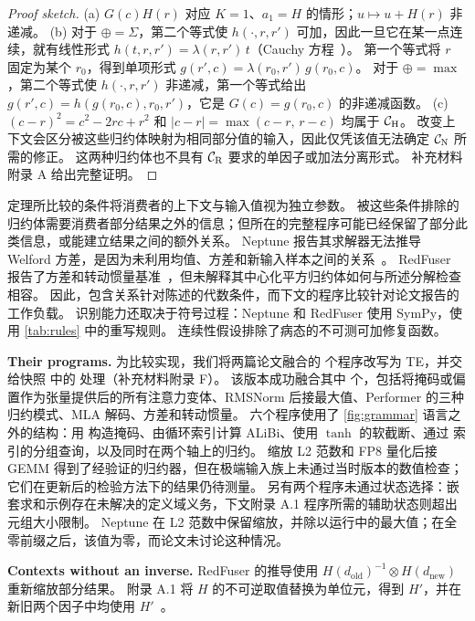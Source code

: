 \begin{proof}[Proof sketch]
(a) $G(c)H(r)$ 对应 $K=1$、$a_1=H$ 的情形；$u\mapsto u+H(r)$ 非递减。
(b) 对于 $\oplus=\Sigma$，第二个等式使 $h(\cdot,r,r')$ 可加，因此一旦它在某一点连续，就有线性形式 $h(t,r,r')=\lambda(r,r')\,t$（Cauchy 方程~\citep{kuczma}）。
第一个等式将 $r$ 固定为某个 $r_0$，得到单项形式 $g(r',c)=\lambda(r_0,r')\,g(r_0,c)$。
对于 $\oplus=\max$，第二个等式使 $h(\cdot,r,r')$ 非递减，第一个等式给出 $g(r',c)=h(g(r_0,c),r_0,r')$，它是 $G(c)=g(r_0,c)$ 的非递减函数。
(c) $(c-r)^2=c^2-2rc+r^2$ 和 $|c-r|=\max(c-r,\,r-c)$ 均属于 $\mathcal{C}_{\mathrm{H}}$。
改变上下文会区分被这些归约体映射为相同部分值的输入，因此仅凭该值无法确定 $\mathcal{C}_{\mathrm{N}}$ 所需的修正。
这两种归约体也不具有 $\mathcal{C}_{\mathrm{R}}$ 要求的单因子或加法分离形式。
补充材料附录 A 给出完整证明。
\end{proof}

定理所比较的条件将消费者的上下文与输入值视为独立参数。
被这些条件排除的归约体需要消费者部分结果之外的信息；但所在的完整程序可能已经保留了部分此类信息，或能建立结果之间的额外关系。
Neptune 报告其求解器无法推导 Welford 方差，是因为未利用均值、方差和新输入样本之间的关系~\citep[\S4.2]{neptune}。
RedFuser 报告了方差和转动惯量基准~\citep[App.~A.6]{redfuser}，但未解释其中心化平方归约体如何与所述分解检查相容。
因此，包含关系针对陈述的代数条件，而下文的程序比较针对论文报告的工作负载。
识别能力还取决于符号过程：Neptune 和 RedFuser 使用 SymPy，\sys 使用 \cref{tab:rules} 中的重写规则。
连续性假设排除了病态的不可测可加修复函数。

\textbf{Their programs.}
为比较实现，我们将两篇论文融合的 \nPriorPrograms 个程序改写为 TE，并交给快照  中的 \sys 处理（补充材料附录 F）。
该版本成功融合其中 \nPriorFused 个，包括将掩码或偏置作为张量提供后的所有注意力变体、RMSNorm 后接最大值、Performer 的三种归约模式、MLA 解码、方差和转动惯量。
六个程序使用了 \cref{fig:grammar} 语言之外的结构：用  构造掩码、由循环索引计算 ALiBi、使用 $\tanh$ 的软截断、通过  索引的分组查询，以及同时在两个轴上的归约。
缩放 L2 范数和 FP8 量化后接 GEMM 得到了经验证的归约器，但在极端输入族上未通过当时版本的数值检查；它们在更新后的检验方法下的结果仍待测量。
另有两个程序未通过状态选择：嵌套求和示例存在未解决的定义域义务，下文附录 A.1 程序所需的辅助状态则超出元组大小限制。
Neptune 在 L2 范数中保留缩放，并除以运行中的最大值；在全零前缀之后，该值为零，而论文未讨论这种情况。

\textbf{Contexts without an inverse.}
RedFuser 的推导使用 $H(d_{\mathrm{old}})^{-1}\otimes H(d_{\mathrm{new}})$ 重新缩放部分结果。
附录 A.1 将 $H$ 的不可逆取值替换为单位元，得到 $H'$，并在新旧两个因子中均使用 $H'$~\citep[Eq.~27--28]{redfuser}。

